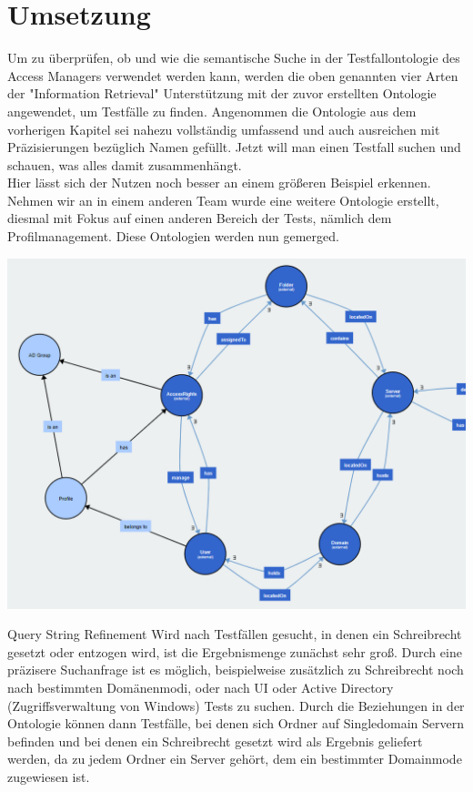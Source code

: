 \section{Umsetzung}
Um zu überprüfen, ob und wie die semantische Suche in der Testfallontologie des Access Managers verwendet werden kann, werden die oben genannten vier Arten der "Information Retrieval" Unterstützung mit der zuvor erstellten Ontologie angewendet, um Testfälle zu finden.\newline
Angenommen die Ontologie aus dem vorherigen Kapitel sei nahezu vollständig umfassend und auch ausreichen mit Präzisierungen bezüglich Namen gefüllt. Jetzt will man einen Testfall suchen und schauen, was alles damit zusammenhängt.\\

Hier lässt sich der Nutzen noch besser an einem größeren Beispiel erkennen. Nehmen wir an in einem anderen Team wurde eine weitere Ontologie erstellt, diesmal mit Fokus auf einen anderen Bereich der Tests, nämlich dem Profilmanagement. Diese Ontologien werden nun gemerged.\\

\begin{center}
    \includegraphics[width=1\textwidth]{Thesis/Images/OntologyProfiles.png}
\end{center}



Query String Refinement\newline
Wird nach Testfällen gesucht, in denen ein Schreibrecht gesetzt oder entzogen wird, ist die Ergebnismenge zunächst sehr groß. Durch eine präzisere Suchanfrage ist es möglich, beispielweise zusätzlich zu Schreibrecht noch nach bestimmten Domänenmodi, oder nach UI oder Active Directory (Zugriffsverwaltung von Windows) Tests zu suchen. Durch die Beziehungen in der Ontologie können dann Testfälle, bei denen sich Ordner auf Singledomain Servern befinden und bei denen ein Schreibrecht gesetzt wird als Ergebnis geliefert werden, da zu jedem Ordner ein Server gehört, dem ein bestimmter Domainmode zugewiesen ist.


